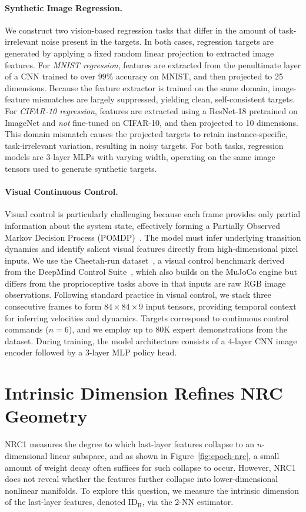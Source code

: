 \documentclass{article}
\newcommand{\idh}{\ensuremath{\mathrm{ID}_{\mathrm{H}}}}
\theoremstyle{plain}
\theoremstyle{definition}
\theoremstyle{remark}
\begin{document}
\paragraph{Synthetic Image Regression.}
We construct two vision-based regression tasks that differ in the amount of task-irrelevant noise present in the targets. In both cases, regression targets are generated by applying a fixed random linear projection to extracted image features.
For \emph{MNIST regression}, features are extracted from the penultimate layer of a CNN trained to over 99\% accuracy on MNIST, and then projected to 25 dimensions. Because the feature extractor is trained on the same domain, image-feature mismatches are largely suppressed, yielding clean, self-consistent targets.
For \emph{CIFAR-10 regression}, features are extracted using a ResNet-18 pretrained on ImageNet and \emph{not} fine-tuned on CIFAR-10, and then projected to 10 dimensions. This domain mismatch causes the projected targets to retain instance-specific, task-irrelevant variation, resulting in noisy targets.
For both tasks, regression models are 3-layer MLPs with varying width, operating on the same image tensors used to generate synthetic targets.


\paragraph{Visual Continuous Control.}
Visual control is particularly challenging because each frame provides only partial information about the system state, effectively forming a Partially Observed Markov Decision Process (POMDP)~\citep{yarats2022drq_v2}. The model must infer underlying transition dynamics and identify salient visual features directly from high-dimensional pixel inputs. We use the Cheetah-run dataset~\citep{lu2023vd4rl}, a visual control benchmark derived from the DeepMind Control Suite~\citep{tassa2018deepmindcontrolsuite}, which also builds on the MuJoCo engine but differs from the proprioceptive tasks above in that inputs are raw RGB image observations. Following standard practice in visual control, we stack three consecutive frames to form $84 \times 84 \times 9$ input tensors, providing temporal context for inferring velocities and dynamics. Targets correspond to continuous control commands ($n=6$), and we employ up to 80K expert demonstrations from the dataset. During training, the model architecture consists of a 4-layer CNN image encoder followed by a 3-layer MLP policy head.

\section{Intrinsic Dimension Refines NRC Geometry} \label{sec:nrc_geometry}
NRC1 measures the degree to which last-layer features collapse to an $n$-dimensional linear subspace, and as shown in Figure~\ref{fig:epoch-nrc}, a small amount of weight decay often suffices for such collapse to occur. However, NRC1 does not reveal whether the features further collapse into lower-dimensional nonlinear manifolds. To explore this question, we measure the intrinsic dimension of the last-layer features, denoted $\idh$, via the 2-NN estimator.
\end{document}
